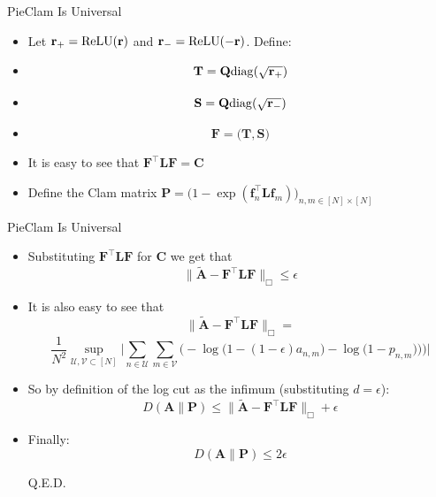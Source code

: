 \documentclass{beamer}
\begin{document}
\begin{frame}{PieClam Is Universal}
\begin{itemize}[itemsep=2pt]
    \item Let $\mathbf{r}_+={\rm ReLU}(\mathbf{r})$ and $\mathbf{r}_-={\rm ReLU}(-\mathbf{r})$. Define:
\item \[\mathbf{T}=\mathbf{Q}{\rm diag}(\sqrt{\mathbf{r}_+})\]
\item \[\mathbf{S}=\mathbf{Q}{\rm diag}(\sqrt{\mathbf{r}_-})\]
\item \[\mathbf{F} = \big(\mathbf{T}, \mathbf{S}\big)\]

\item It is easy to see that $\mathbf{F}^\top \mathbf{L}\mathbf{F} = \mathbf{C}$

\item Define the Clam matrix $\mathbf{P} = \big(1-\exp(\mathbf{f}_n^\top \mathbf{L} \mathbf{f}_m)\big)_{n,m \in [N]\times[N]}$
\end{itemize}
\end{frame}


\begin{frame}{PieClam Is Universal}
\begin{itemize}[itemsep=2pt]
    \item Substituting $\mathbf{F}^\top \mathbf{L} \mathbf{F}$ for $\mathbf{C}$ we get that
\[\|\tilde{\mathbf{A}} - \mathbf{F}^\top\mathbf{L}\mathbf{F}\|_\Box \leq \epsilon\]

\item It is also easy to see that
\[\|\tilde{\mathbf{A}} - \mathbf{F}^\top\mathbf{L}\mathbf{F}\|_\Box = \]
\[\frac{1}{N^2}\sup_{\mathcal{U},\mathcal{V}\subset[N]}\Big|\sum_{n\in \mathcal{U}}\sum_{m\in \mathcal{V}}\Big(-\log\big(1-(1-\epsilon)a_{n,m}\big) - \log\big(1-p_{n,m})\big)\Big)\Big|\]
\item So by definition of the log cut as the infimum (substituting $d=\epsilon$):
\[D(\mathbf{A}\|\mathbf{P})\leq\|\tilde{\mathbf{A}} - \mathbf{F}^\top\mathbf{L}\mathbf{F}\|_\Box + \epsilon\]
\item Finally:
\[D(\mathbf{A}\|\mathbf{P})\leq 2\epsilon\]

Q.E.D.
\end{itemize}
\end{frame}
\end{document}
